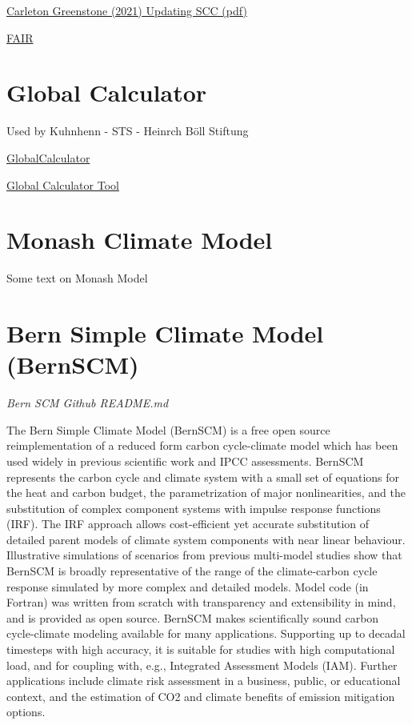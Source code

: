 \documentclass[
]{book}
\begin{document}
\href{Greenstone_2021_Updating_SCC.pdf}{Carleton Greenstone (2021) Updating SCC (pdf)}

\href{https://fair.readthedocs.io/en/latest/}{FAIR}

\hypertarget{global-calculator}{%
\section{Global Calculator}\label{global-calculator}}

Used by Kuhnhenn - STS - Heinrch Böll Stiftung

\href{http://www.globalcalculator.org/}{GlobalCalculator}

\href{http://tool.globalcalculator.org/globcalc.html?levers=22rfoe2e\%2013be1111c2c2c1n31hfjdcef222hp233f211111fn2211111111/dashboard/en}{Global Calculator Tool}

\hypertarget{monash-climate-model}{%
\section{Monash Climate Model}\label{monash-climate-model}}

Some text on Monash Model

\hypertarget{bern-simple-climate-model-bernscm}{%
\section{Bern Simple Climate Model (BernSCM)}\label{bern-simple-climate-model-bernscm}}

\emph{Bern SCM Github README.md}

The Bern Simple Climate Model (BernSCM) is a free open source reimplementation of a reduced form carbon cycle-climate model which has been used widely in previous scientific work and IPCC assessments.
BernSCM represents the carbon cycle and climate system with a small set of equations for the heat and carbon budget, the parametrization of major nonlinearities, and the substitution of complex component systems with impulse response functions (IRF). The IRF approach allows cost-efficient yet accurate substitution of detailed parent models of climate system components with near linear behaviour. Illustrative simulations of scenarios from previous multi-model studies show that BernSCM is broadly representative of the range of the climate-carbon cycle response simulated by more complex and detailed models. Model code (in Fortran) was written from scratch with transparency and extensibility in mind, and is provided as open source. BernSCM makes scientifically sound carbon cycle-climate modeling available for many applications. Supporting up to decadal timesteps with high accuracy, it is suitable for studies with high computational load, and for coupling with, e.g., Integrated Assessment Models (IAM). Further applications include climate risk assessment in a business, public, or educational context, and the estimation of CO2 and climate benefits of emission mitigation options.
\end{document}
